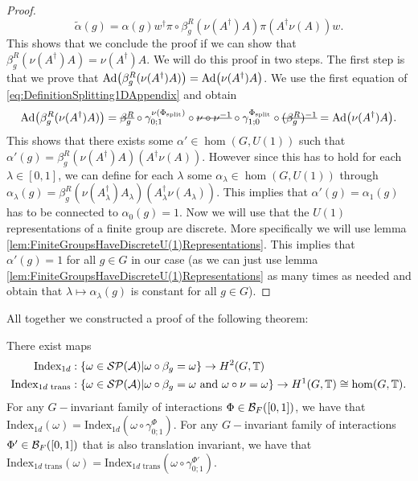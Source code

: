 \documentclass[11pt,a4paper,twoside]{article}
\numberwithin{equation}{section}
\begin{document}
\begin{proof}
\begin{equation}
			\tilde{\alpha}(g)=\alpha(g)w^\dagger \pi\circ\beta_g^R(\nu(A^\dagger)A)\pi(A^\dagger\nu(A))w.
		\end{equation}
		This shows that we conclude the proof if we can show that $\beta_g^R(\nu(A^\dagger)A)=\nu(A^\dagger)A$. We will do this proof in two steps. The first step is that we prove that $\Ad{\beta_g^R(\nu(A^\dagger)A)}=\Ad{\nu(A^\dagger)A}$. We use the first equation of \eqref{eq:DefinitionSplitting1DAppendix} and obtain
		\begin{align}
			\Ad{\beta_g^R(\nu(A^\dagger)A)}=\stkout{\beta_g^R}\circ\gamma^{\nu(\Phi_{\text{split}})}_{0;1}\circ\stkout{\nu\circ\nu^{-1}}\circ\gamma^{\Phi_{\text{split}}}_{1;0}\circ\stkout{(\beta_g^R)^{-1}}=\Ad{\nu(A^\dagger)A}.
		\end{align}
		This shows that there exists some $\alpha'\in\hom(G,U(1))$ such that $\alpha'(g)=\beta_g^R(\nu(A^\dagger)A)(A^\dagger \nu(A))$. However since this has to hold for each $\lambda\in[0,1]$, we can define for each $\lambda$ some $\alpha_\lambda\in\hom(G,U(1))$ through $\alpha_\lambda(g)=\beta_g^R(\nu(A^\dagger_\lambda)A_\lambda)(A^\dagger_\lambda \nu(A_\lambda))$. This implies that $\alpha'(g)=\alpha_1(g)$ has to be connected to $\alpha_0(g)=1$. Now we will use that the $U(1)$ representations of a finite group are discrete. More specifically we will use lemma \ref{lem:FiniteGroupsHaveDiscreteU(1)Representations}. This implies that $\alpha'(g)=1$ for all $g\in G$ in our case (as we can just use lemma \ref{lem:FiniteGroupsHaveDiscreteU(1)Representations} as many times as needed and obtain that $\lambda\mapsto\alpha_\lambda(g)$ is constant for all $g\in G$).
	\end{proof}
	All together we constructed a proof of the following theorem:
	\begin{theorem}
		There exist maps
		\begin{align}
			\textrm{Index}_{1d}&:\{\omega\in\mathcal{S}\mathcal P(\mathcal A)|\omega\circ\beta_g=\omega\}\rightarrow H^2(G,\mathbb T)\\
			\nonumber
			\textrm{Index}_{1d\text{ trans}}&:\{\omega\in\mathcal{S}\mathcal P(\mathcal A)|\omega\circ\beta_g=\omega\text{ and }\omega\circ\nu=\omega\}\rightarrow H^1(G,\mathbb T)\cong \hom(G,\mathbb T).
		\end{align}
		For any $G-$invariant family of interactions $\Phi\in\mathcal B_{F}([0,1])$, we have that $\textrm{Index}_{1d}(\omega)=\textrm{Index}_{1d}(\omega\circ\gamma^\Phi_{0;1})$. For any $G-$invariant family of interactions $\Phi'\in\mathcal B_{F}([0,1])$ that is also translation invariant, we have that $\textrm{Index}_{1d\text{ trans}}(\omega)=\textrm{Index}_{1d\text{ trans}}(\omega\circ\gamma^{\Phi'}_{0;1})$.
	\end{theorem}
\end{document}
